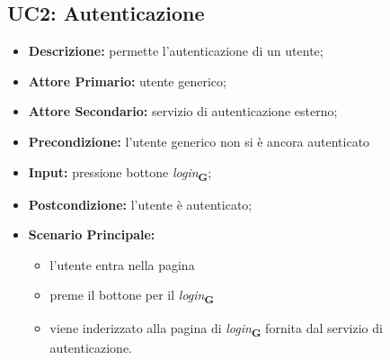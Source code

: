 \subsection{UC2: Autenticazione}
    \label{sec:UC2}
    \begin{itemize}
        \item \textbf{Descrizione:} permette l'autenticazione di un utente;
        \item \textbf{Attore Primario:} utente generico;
        \item \textbf{Attore Secondario:} servizio di autenticazione esterno;
        \item \textbf{Precondizione:} l'utente generico non si è ancora autenticato
        \item \textbf{Input:} pressione bottone \textit{login}\textsubscript{\textbf{G}};
        \item \textbf{Postcondizione:} l'utente è autenticato;
        \item \textbf{Scenario Principale:} 
        \begin{itemize}
            \item l'utente entra nella pagina
            \item preme il bottone per il \textit{login}\textsubscript{\textbf{G}}
            \item viene inderizzato alla pagina di \textit{login}\textsubscript{\textbf{G}} fornita dal servizio di autenticazione.
        \end{itemize}
    \end{itemize}